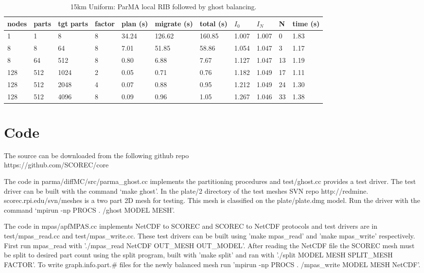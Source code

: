 \documentclass[a4paper]{article}
\begin{document}
\begin{table}
\caption{\label{tab:15kmplrib}15km Uniform: ParMA local RIB followed by ghost balancing.}
\begin{tabular}{  l | l | l | l | l | l | l | l | l | l | l }
    \hline
    nodes & parts & tgt parts & factor & plan (s) & migrate (s) & total (s) & $I_0$ & $I_N$ & N & time (s) \\ \hline
      1 & 1 & 8 & 8 & 34.24 & 126.62 & 160.85 & 1.007 & 1.007 & 0 & 1.83 \\
      8 & 8 & 64 & 8 & 7.01 & 51.85 & 58.86 & 1.054 & 1.047 & 3 & 1.17 \\
      8 & 64 & 512 & 8 & 0.80 & 6.88 & 7.67 & 1.127 & 1.047 & 13 & 1.19 \\
      128 & 512 & 1024 & 2 & 0.05 & 0.71 & 0.76 & 1.182 & 1.049 & 17 & 1.11 \\
      128 & 512 & 2048 & 4 & 0.07 & 0.88 & 0.95 & 1.212 & 1.049 & 24 & 1.30 \\
      128 & 512 & 4096 & 8 & 0.09 & 0.96 & 1.05 & 1.267 & 1.046 & 33 & 1.38 \\
\end{tabular}
\end{table}

\section{Code}

The source can be downloaded from the following github repo \\
https://github.com/SCOREC/core

The code in parma/diffMC/src/parma\_ghost.cc implements the partitioning
procedures and test/ghost.cc provides a test driver.
The test driver can be built with the command `make ghost'.
In the plate/2 directory of the test meshes SVN repo http://redmine.
scorec.rpi.edu/svn/meshes is a two part 2D mesh for testing.
This mesh is classified on the plate/plate.dmg model.  Run the
driver with the command `mpirun -np PROCS .
/ghost MODEL MESH'.

The code in mpas/apfMPAS.cc implements NetCDF to SCOREC and SCOREC to
NetCDF protocols and test drivers are in test/mpas\_read.cc and
test/mpas\_write.cc. These test drivers can be built using 'make mpas\_read'
and 'make mpas\_write' respectively. First run mpas\_read with
'./mpas\_read NetCDF OUT\_MESH OUT\_MODEL'.
After reading the NetCDF file the SCOREC mesh must be split to desired part
count using the split program, built with 'make split' and ran with './split
MODEL MESH SPLIT\_MESH FACTOR'.
To write graph.info.part.\# files for the newly
balanced mesh run 'mpirun -np PROCS .
/mpas\_write MODEL MESH NetCDF'.

\newpage


\end{document}
